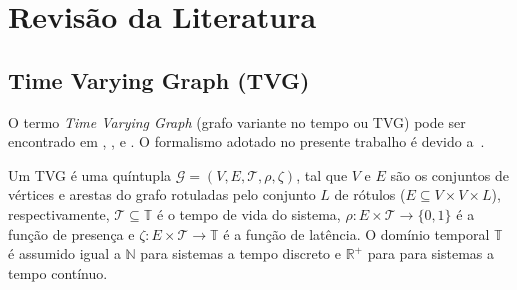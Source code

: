
\chapter{Revisão da Literatura}\label{cap:revisaodaliteratura}


\section{Time Varying Graph (TVG)} \label{sec:fund}


O termo \emph{Time Varying Graph} (grafo variante no tempo ou TVG) pode ser encontrado em \cite{sant:09}, \cite{tang:10}, \cite{lat:10} e \cite{lat:12}. O formalismo adotado no presente trabalho é devido a~\cite{sant:12}. 

Um TVG é uma quíntupla $\mathcal{G}=(V,E,\mathcal{T},\rho,\zeta)$, tal que $V$ e $E$ são os conjuntos de vértices e arestas do grafo rotuladas pelo conjunto $L$ de rótulos ($E \subseteq V \times V \times L$), respectivamente, $\mathcal{T}\subseteq \mathbb{T}$ é o tempo de vida do sistema, $\rho: E \times \mathcal{T} \rightarrow \{0,1\}$ é a função de presença e $\zeta: E \times \mathcal{T} \rightarrow \mathbb{T}$ é a função de latência. O domínio temporal $\mathbb{T}$ é assumido igual a $\mathbb{N}$ para sistemas a tempo discreto e $\mathbb{R}^+$ para para sistemas a tempo contínuo.

